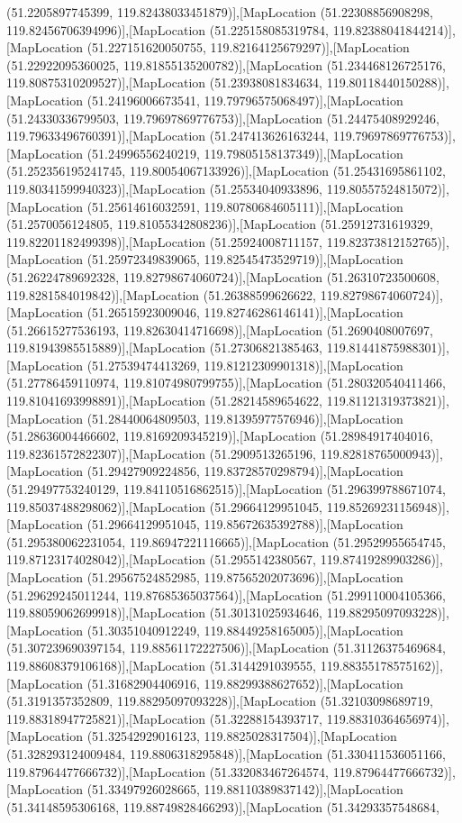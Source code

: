 (51.2205897745399, 119.82438033451879)],[MapLocation (51.22308856908298, 119.82456706394996)],[MapLocation (51.225158085319784, 119.82388041844214)],[MapLocation (51.227151620050755, 119.82164125679297)],[MapLocation (51.22922095360025, 119.81855135200782)],[MapLocation (51.234468126725176, 119.80875310209527)],[MapLocation (51.23938081834634, 119.80118440150288)],[MapLocation (51.24196006673541, 119.79796575068497)],[MapLocation (51.24330336799503, 119.79697869776753)],[MapLocation (51.24475408929246, 119.79633496760391)],[MapLocation (51.247413626163244, 119.79697869776753)],[MapLocation (51.24996556240219, 119.79805158137349)],[MapLocation (51.252356195241745, 119.80054067133926)],[MapLocation (51.25431695861102, 119.80341599940323)],[MapLocation (51.25534040933896, 119.80557524815072)],[MapLocation (51.25614616032591, 119.80780684605111)],[MapLocation (51.2570056124805, 119.81055342808236)],[MapLocation (51.25912731619329, 119.82201182499398)],[MapLocation (51.25924008711157, 119.82373812152765)],[MapLocation (51.25972349839065, 119.82545473529719)],[MapLocation (51.26224789692328, 119.82798674060724)],[MapLocation (51.26310723500608, 119.8281584019842)],[MapLocation (51.26388599626622, 119.82798674060724)],[MapLocation (51.26515923009046, 119.82746286146141)],[MapLocation (51.26615277536193, 119.82630414716698)],[MapLocation (51.2690408007697, 119.81943985515889)],[MapLocation (51.27306821385463, 119.81441875988301)],[MapLocation (51.27539474413269, 119.81212309901318)],[MapLocation (51.27786459110974, 119.81074980799755)],[MapLocation (51.280320540411466, 119.81041693998891)],[MapLocation (51.28214589654622, 119.81121319373821)],[MapLocation (51.28440064809503, 119.81395977576946)],[MapLocation (51.28636004466602, 119.8169209345219)],[MapLocation (51.28984917404016, 119.82361572822307)],[MapLocation (51.2909513265196, 119.82818765000943)],[MapLocation (51.29427909224856, 119.83728570298794)],[MapLocation (51.29497753240129, 119.84110516862515)],[MapLocation (51.296399788671074, 119.85037488298062)],[MapLocation (51.29664129951045, 119.85269231156948)],[MapLocation (51.29664129951045, 119.85672635392788)],[MapLocation (51.295380062231054, 119.86947221116665)],[MapLocation (51.29529955654745, 119.87123174028042)],[MapLocation (51.2955142380567, 119.87419289903286)],[MapLocation (51.29567524852985, 119.87565202073696)],[MapLocation (51.29629245011244, 119.87685365037564)],[MapLocation (51.299110004105366, 119.88059062699918)],[MapLocation (51.30131025934646, 119.88295097093228)],[MapLocation (51.30351040912249, 119.88449258165005)],[MapLocation (51.307239690397154, 119.88561172227506)],[MapLocation (51.31126375469684, 119.88608379106168)],[MapLocation (51.3144291039555, 119.88355178575162)],[MapLocation (51.31682904406916, 119.88299388627652)],[MapLocation (51.3191357352809, 119.88295097093228)],[MapLocation (51.32103098689719, 119.88318947725821)],[MapLocation (51.32288154393717, 119.88310364656974)],[MapLocation (51.32542929016123, 119.8825028317504)],[MapLocation (51.328293124009484, 119.8806318295848)],[MapLocation (51.330411536051166, 119.87964477666732)],[MapLocation (51.332083467264574, 119.87964477666732)],[MapLocation (51.33497926028665, 119.88110389837142)],[MapLocation (51.34148595306168, 119.88749828466293)],[MapLocation (51.34293357548684, 